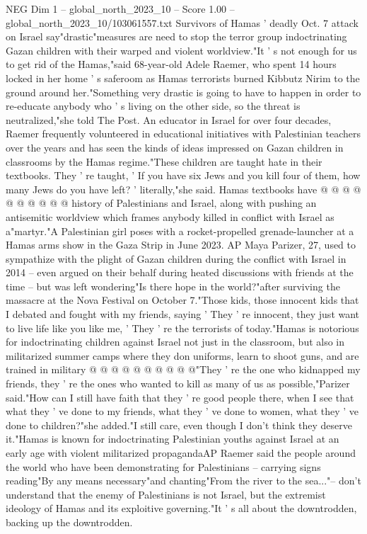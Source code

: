 \begin{textsample}{NEG Dim 1 – global\_north\_2023\_10 – Score 1.00 – global\_north\_2023\_10/103061557.txt}  \label{ex:f1_neg_313}
Survivors of Hamas ' deadly Oct. 7 attack on Israel say"drastic"measures are need to stop the terror group indoctrinating Gazan children with their warped and violent worldview."It ' s not enough for us to get rid of the Hamas,"said 68-year-old Adele Raemer, who spent 14 hours locked in her home ' s saferoom as Hamas terrorists burned Kibbutz Nirim to the ground around her."Something very drastic is going to have to happen in order to re-educate anybody who ' s living on the other side, so the threat is neutralized,"she told The Post.
An educator in Israel for over four decades, Raemer frequently volunteered in educational initiatives with Palestinian teachers over the years and has seen the kinds of ideas impressed on Gazan children in classrooms by the Hamas regime."These children are taught hate in their textbooks.
They ' re taught, ' If you have six Jews and you kill four of them, how many Jews do you have left? ' literally,"she said.
Hamas textbooks have @ @ @ @ @ @ @ @ @ @ history of Palestinians and Israel, along with pushing an antisemitic worldview which frames anybody killed in conflict with Israel as a"martyr."A Palestinian girl poses with a rocket-propelled grenade-launcher at a Hamas arms show in the Gaza Strip in June 2023.
AP Maya Parizer, 27, used to sympathize with the plight of Gazan children during the conflict with Israel in 2014 -- even argued on their behalf during heated discussions with friends at the time -- but was left wondering"Is there hope in the world?"after surviving the massacre at the Nova Festival on October 7."Those kids, those innocent kids that I debated and fought with my friends, saying ' They ' re innocent, they just want to live life like you like me, ' They ' re the terrorists of today."Hamas is notorious for indoctrinating children against Israel not just in the classroom, but also in militarized summer camps where they don uniforms, learn to shoot guns, and are trained in military @ @ @ @ @ @ @ @ @ @"They ' re the one who kidnapped my friends, they ' re the ones who wanted to kill as many of us as possible,"Parizer said."How can I still have faith that they ' re good people there, when I see that what they ' ve done to my friends, what they ' ve done to women, what they ' ve done to children?"she added."I still care, even though I don't think they deserve it."Hamas is known for indoctrinating Palestinian youths against Israel at an early age with violent militarized propagandaAP Raemer said the people around the world who have been demonstrating for Palestinians -- carrying signs reading"By any means necessary"and chanting"From the river to the sea..."-- don't understand that the enemy of Palestinians is not Israel, but the extremist ideology of Hamas and its exploitive governing."It ' s all about the downtrodden, backing up the downtrodden.

\end{textsample}
